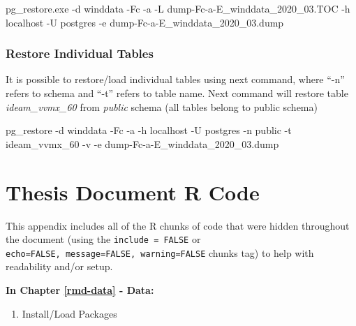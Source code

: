 \documentclass[12pt,twoside]{reedthesis}
\newenvironment{Shaded}{\begin{snugshade}}{\end{snugshade}}
\newcommand{\ExtensionTok}[1]{#1}
\newcommand{\NormalTok}[1]{#1}
\providecommand{\tightlist}{%
  \setlength{\itemsep}{0pt}\setlength{\parskip}{0pt}}
\begin{document}
\scriptsize

\vspace{0.4cm}
\begin{Shaded}
\begin{Highlighting}[]
      \ExtensionTok{pg_restore.exe}\NormalTok{ -d winddata -Fc -a -L dump-Fc-a-E_winddata_2020_03.TOC -h localhost -U postgres}
       \ExtensionTok{-e}\NormalTok{ dump-Fc-a-E_winddata_2020_03.dump}
\end{Highlighting}
\end{Shaded}
\normalsize

\hypertarget{restore-individual-tables}{%
\subsection{Restore Individual Tables}\label{restore-individual-tables}}

It is possible to restore/load individual tables using next command, where ``-n'' refers to schema and ``-t'' refers to table name. Next command will restore table \emph{ideam\_vvmx\_60} from \emph{public} schema (all tables belong to public schema)

\scriptsize

\vspace{0.4cm}
\begin{Shaded}
\begin{Highlighting}[]
      \ExtensionTok{pg_restore}\NormalTok{ -d winddata -Fc -a -h localhost -U postgres -n public -t ideam_vvmx_60 -v }
       \ExtensionTok{-e}\NormalTok{ dump-Fc-a-E_winddata_2020_03.dump}
\end{Highlighting}
\end{Shaded}
\normalsize

\hypertarget{docrcode}{%
\chapter{Thesis Document R Code}\label{docrcode}}

This appendix includes all of the R chunks of code that were hidden throughout the document (using the \texttt{include\ =\ FALSE} or \texttt{echo=FALSE,\ message=FALSE,\ warning=FALSE} chunks tag) to help with readability and/or setup.

\textbf{In Chapter \ref{rmd-data} - Data:}
\begin{enumerate}
\def\labelenumi{\arabic{enumi}.}
\tightlist
\item
  Install/Load Packages
\end{enumerate}
\tiny
\end{document}
